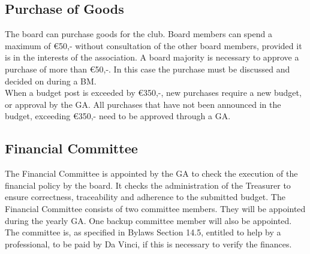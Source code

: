\documentclass[a4paper]{article}
\newcommand{\Asta}{Bylaws} %
\begin{document}
\subsection{Purchase of Goods}
The board can purchase goods for the club. Board members can spend a maximum of €50,- without consultation of the other board members, provided it is in the interests of the association. A board majority is necessary to approve a purchase of more than €50,-. In this case the purchase must be discussed and decided on during a { BM}. \\

When a budget post is exceeded by €350,-, new purchases require a new budget, or approval by the { GA}. All purchases that have not been announced in the budget, exceeding €350,- need to be approved through a { GA}.

\subsection{Financial Committee}
The Financial Committee is appointed by the { GA} to check the execution of the financial policy by the board. It checks the administration of the Treasurer to ensure correctness, traceability and adherence to the submitted budget. The Financial Committee consists of two committee members. They will be appointed during the yearly { GA}. One backup committee member will also be appointed. The committee is, as specified in { \Asta} Section 14.5, entitled to help by a professional, to be paid by Da Vinci, if this is necessary to verify the finances.
\end{document}

